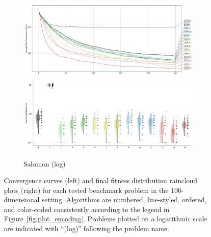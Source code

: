 \begin{figure}[p]
\begin{subfigure}{1\textwidth}
    \centering
    \includegraphics[width=.49\textwidth]{Figures/results/100/Salomon_All_selected_algorithms_dim100_annot_legend.png}
    \includegraphics[width=.49\textwidth]{Figures/results/100/Salomon_all_dim100_raincloud_vertical.png}
    \caption{Salomon (log)}
\end{subfigure}

    \captionsetup{list=no}
\caption[Convergence curves and final fitness distribution raincloud plots for 100-dimensional problems]{Convergence curves (left) and final fitness distribution raincloud plots (right) for each tested benchmark problem in the 100-dimensional setting. Algorithms are numbered, line-styled, ordered, and color-coded consistently according to the legend in Figure~\ref{fig:plot_encoding}. Problems plotted on a logarithmic scale are indicated with ``(log)'' following the problem name.}
\end{figure}




